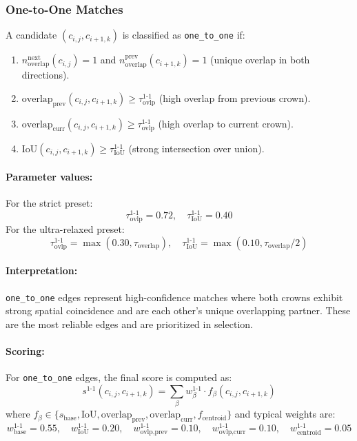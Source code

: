 \subsubsection{One-to-One Matches}

A candidate $(c_{i,j}, c_{i+1,k})$ is classified as \texttt{one\_to\_one} if:
\begin{enumerate}
    \item $n_{\text{overlap}}^{\text{next}}(c_{i,j}) = 1$ and $n_{\text{overlap}}^{\text{prev}}(c_{i+1,k}) = 1$ (unique overlap in both directions).
    \item $\text{overlap}_{\text{prev}}(c_{i,j}, c_{i+1,k}) \geq \tau_{\text{ovlp}}^{\text{1-1}}$ (high overlap from previous crown).
    \item $\text{overlap}_{\text{curr}}(c_{i,j}, c_{i+1,k}) \geq \tau_{\text{ovlp}}^{\text{1-1}}$ (high overlap to current crown).
    \item $\text{IoU}(c_{i,j}, c_{i+1,k}) \geq \tau_{\text{IoU}}^{\text{1-1}}$ (strong intersection over union).
\end{enumerate}

\paragraph{Parameter values:} For the strict preset:
\[
\tau_{\text{ovlp}}^{\text{1-1}} = 0.72, \quad \tau_{\text{IoU}}^{\text{1-1}} = 0.40
\]
For the ultra-relaxed preset:
\[
\tau_{\text{ovlp}}^{\text{1-1}} = \max(0.30, \tau_{\text{overlap}}), \quad \tau_{\text{IoU}}^{\text{1-1}} = \max(0.10, \tau_{\text{overlap}}/2)
\]

\paragraph{Interpretation:} \texttt{one\_to\_one} edges represent high-confidence matches where both crowns exhibit strong spatial coincidence and are each other's unique overlapping partner. These are the most reliable edges and are prioritized in selection.

\paragraph{Scoring:} For \texttt{one\_to\_one} edges, the final score is computed as:
\[
s^{\text{1-1}}(c_{i,j}, c_{i+1,k}) = \sum_{\beta} w_\beta^{\text{1-1}} \cdot f_\beta(c_{i,j}, c_{i+1,k})
\]
where $f_\beta \in \{s_{\text{base}}, \text{IoU}, \text{overlap}_{\text{prev}}, \text{overlap}_{\text{curr}}, f_{\text{centroid}}\}$ and typical weights are:
\[
w_{\text{base}}^{\text{1-1}} = 0.55, \quad w_{\text{IoU}}^{\text{1-1}} = 0.20, \quad w_{\text{ovlp,prev}}^{\text{1-1}} = 0.10, \quad w_{\text{ovlp,curr}}^{\text{1-1}} = 0.10, \quad w_{\text{centroid}}^{\text{1-1}} = 0.05
\]


